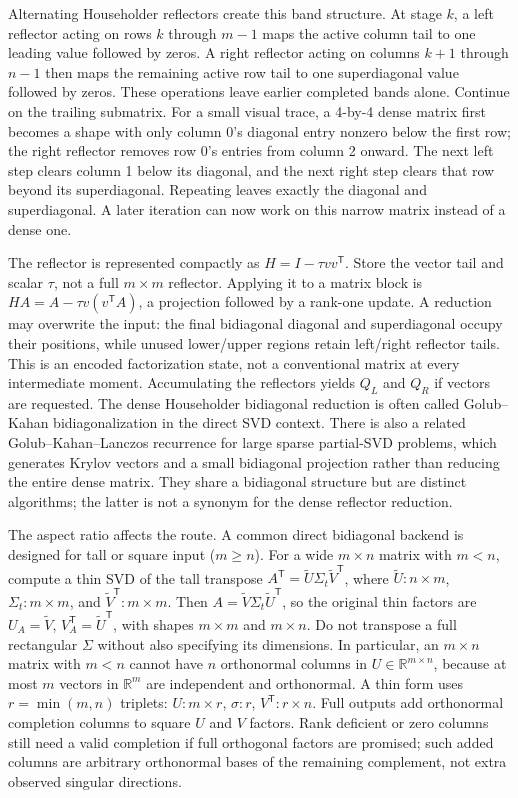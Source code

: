 Alternating Householder reflectors create this band structure. At stage \(k\), a left reflector acting on rows \(k\) through \(m-1\) maps the active column tail to one leading value followed by zeros. A right reflector acting on columns \(k+1\) through \(n-1\) then maps the remaining active row tail to one superdiagonal value followed by zeros. These operations leave earlier completed bands alone. Continue on the trailing submatrix. For a small visual trace, a 4-by-4 dense matrix first becomes a shape with only column 0's diagonal entry nonzero below the first row; the right reflector removes row 0's entries from column 2 onward. The next left step clears column 1 below its diagonal, and the next right step clears that row beyond its superdiagonal. Repeating leaves exactly the diagonal and superdiagonal. A later iteration can now work on this narrow matrix instead of a dense one.

The reflector is represented compactly as \(H=I-\tau vv^\mathsf T\). Store the vector tail and scalar \(\tau\), not a full \(m\times m\) reflector. Applying it to a matrix block is \(HA=A-\tau v(v^\mathsf TA)\), a projection followed by a rank-one update. A reduction may overwrite the input: the final bidiagonal diagonal and superdiagonal occupy their positions, while unused lower/upper regions retain left/right reflector tails. This is an encoded factorization state, not a conventional matrix at every intermediate moment. Accumulating the reflectors yields \(Q_L\) and \(Q_R\) if vectors are requested. The dense Householder bidiagonal reduction is often called Golub--Kahan bidiagonalization in the direct SVD context. There is also a related Golub--Kahan--Lanczos recurrence for large sparse partial-SVD problems, which generates Krylov vectors and a small bidiagonal projection rather than reducing the entire dense matrix. They share a bidiagonal structure but are distinct algorithms; the latter is not a synonym for the dense reflector reduction.

The aspect ratio affects the route. A common direct bidiagonal backend is designed for tall or square input (\(m\ge n\)). For a wide \(m\times n\) matrix with \(m<n\), compute a thin SVD of the tall transpose \(A^\mathsf T=\tilde U\Sigma_t\tilde V^\mathsf T\), where \(\tilde U:n\times m\), \(\Sigma_t:m\times m\), and \(\tilde V^\mathsf T:m\times m\). Then \(A=\tilde V\Sigma_t\tilde U^\mathsf T\), so the original thin factors are \(U_A=\tilde V\), \(V_A^\mathsf T=\tilde U^\mathsf T\), with shapes \(m\times m\) and \(m\times n\). Do not transpose a full rectangular \(\Sigma\) without also specifying its dimensions. In particular, an \(m\times n\) matrix with \(m<n\) cannot have \(n\) orthonormal columns in \(U\in\mathbb R^{m\times n}\), because at most \(m\) vectors in \(\mathbb R^m\) are independent and orthonormal. A thin form uses \(r=\min(m,n)\) triplets: \(U:m\times r\), \(\sigma:r\), \(V^\mathsf T:r\times n\). Full outputs add orthonormal completion columns to square \(U\) and \(V\) factors. Rank deficient or zero columns still need a valid completion if full orthogonal factors are promised; such added columns are arbitrary orthonormal bases of the remaining complement, not extra observed singular directions.

